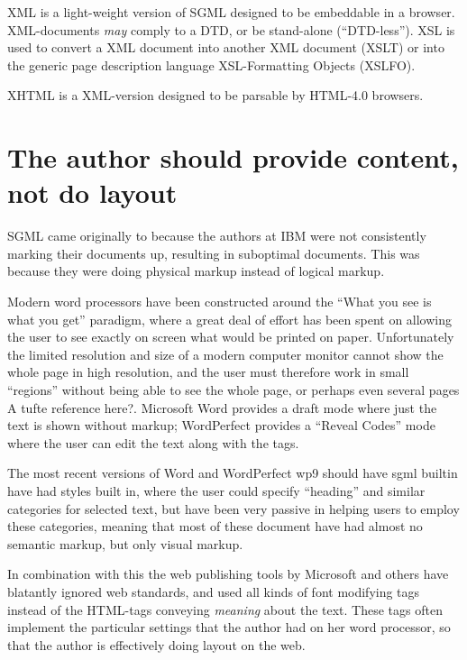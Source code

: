 XML is a light-weight version of SGML designed to be embeddable in a
browser.  XML-documents \textit{may} comply to a DTD, or be
stand-alone (``DTD-less'').  XSL is used to convert a XML document
into another XML document (XSLT) or into the generic page description
language XSL-Formatting Objects (XSLFO).

XHTML is a XML-version designed to be parsable by HTML-4.0 browsers.


\section{The author should provide content, not do layout}

SGML came originally to because the authors at IBM were not
consistently marking their documents up, resulting in suboptimal
documents.  This was because they were doing physical markup instead
of logical markup.

Modern word processors have been constructed around the ``What you see
is what you get'' paradigm, where a great deal of effort has been
spent on allowing the user to see exactly on screen what would be
printed on paper.   Unfortunately the limited resolution and size of a modern
computer monitor cannot show the whole page in high resolution, and
the user must therefore work in small ``regions'' without being able
to see the whole page, or perhaps even several pages \textsf{A tufte
  reference here?}.  Microsoft Word provides a draft mode where just
the text is shown without markup;  WordPerfect provides a ``Reveal
Codes'' mode where the user can edit the text along with the tags.

The most recent versions of Word and WordPerfect \textsf{wp9 should
  have sgml builtin} have had styles built
in, where the user could specify ``heading'' and similar categories
for selected text, but have been very passive in helping users to
employ these categories, meaning that most of these
document have had almost no semantic markup, but only visual markup.

In combination with this the web publishing tools by Microsoft and
others have blatantly ignored web standards, and used all kinds of
font modifying tags instead of the HTML-tags conveying \textit{meaning}
about the text.  These tags often implement the particular settings
that the author had on her word processor, so that the author is
effectively doing layout on the web.

